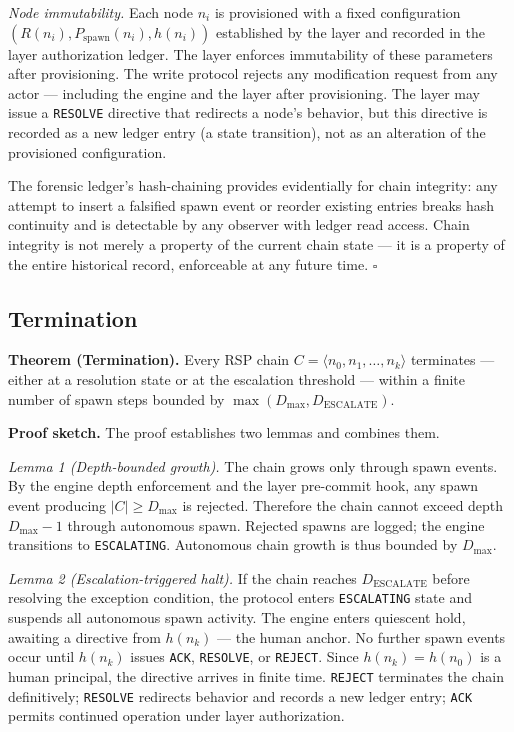 \medskip
\textit{Node immutability.} Each node $n_i$ is provisioned with a fixed configuration $(R(n_i), P_{\mathrm{spawn}}(n_i), h(n_i))$ established by the \purpose{} layer and recorded in the \fact{} layer authorization ledger. The \fact{} layer enforces immutability of these parameters after provisioning. The write protocol rejects any modification request from any actor --- including the \bounds{} engine and the \purpose{} layer after provisioning. The \purpose{} layer may issue a \texttt{RESOLVE} directive that redirects a node's behavior, but this directive is recorded as a new ledger entry (a state transition), not as an alteration of the provisioned configuration.

The forensic ledger's hash-chaining provides evidentially for chain integrity: any attempt to insert a falsified spawn event or reorder existing entries breaks hash continuity and is detectable by any observer with ledger read access. Chain integrity is not merely a property of the current chain state --- it is a property of the entire historical record, enforceable at any future time. $\square$

\subsection{Termination}
\label{sec:termination}

\medskip
\noindent\textbf{Theorem (Termination).} Every RSP chain $C = \langle n_0, n_1, \ldots, n_k \rangle$ terminates --- either at a resolution state or at the escalation threshold --- within a finite number of spawn steps bounded by $\max(D_{\mathrm{max}}, D_{\mathrm{ESCALATE}})$.

\medskip
\noindent\textbf{Proof sketch.} The proof establishes two lemmas and combines them.

\medskip
\textit{Lemma 1 (Depth-bounded growth).} The chain grows only through spawn events. By the \bounds{} engine depth enforcement and the \fact{} layer pre-commit hook, any spawn event producing $|C| \geq D_{\mathrm{max}}$ is rejected. Therefore the chain cannot exceed depth $D_{\mathrm{max}} - 1$ through autonomous spawn. Rejected spawns are logged; the \bounds{} engine transitions to \texttt{ESCALATING}. Autonomous chain growth is thus bounded by $D_{\mathrm{max}}$.

\medskip
\textit{Lemma 2 (Escalation-triggered halt).} If the chain reaches $D_{\mathrm{ESCALATE}}$ before resolving the exception condition, the protocol enters \texttt{ESCALATING} state and suspends all autonomous spawn activity. The \bounds{} engine enters quiescent hold, awaiting a directive from $h(n_k)$ --- the human anchor. No further spawn events occur until $h(n_k)$ issues \texttt{ACK}, \texttt{RESOLVE}, or \texttt{REJECT}. Since $h(n_k) = h(n_0)$ is a human principal, the directive arrives in finite time. \texttt{REJECT} terminates the chain definitively; \texttt{RESOLVE} redirects behavior and records a new ledger entry; \texttt{ACK} permits continued operation under \purpose{} layer authorization.

